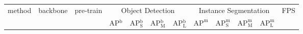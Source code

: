     
    \begin{table}[t]
    \centering
    \footnotesize
    {
    {
    \begin{tabular}{lccccccccccc}
    \multicolumn{1}{l|}{\multirow{2}{*}{method}} & \multicolumn{1}{c}{\multirow{2}{*}{backbone}} & \multicolumn{1}{c|}{\multirow{2}{*}{pre-train}} & \multicolumn{4}{c|}{Object Detection} & \multicolumn{4}{c|}{Instance Segmentation} & \multirow{2}{*}{FPS} \\
    \multicolumn{1}{l|}{} & \multicolumn{1}{c}{} & \multicolumn{1}{c|}{} & AP$^\text{b}$ & AP$^\text{b}_\text{S}$ & AP$^\text{b}_\text{M}$ & \multicolumn{1}{c|}{AP$^\text{b}_\text{L}$} & $\text{AP}^\text{m}$ & $\text{AP}^\text{m}_\text{S}$ & $\text{AP}^\text{m}_\text{M}$ & \multicolumn{1}{c|}{$\text{AP}^\text{m}_\text{L}$} &  \\

\end{tabular}}}
\end{table}

